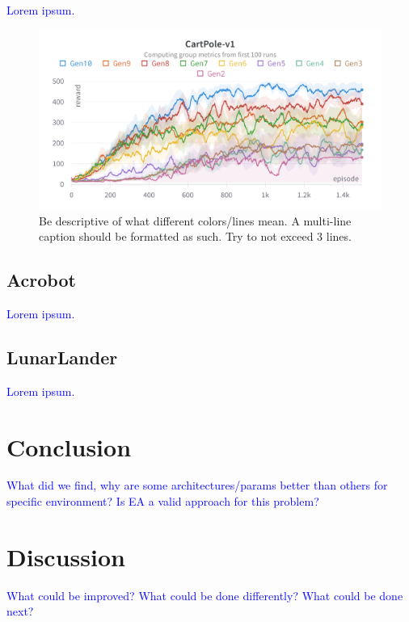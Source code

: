\documentclass{article}
\newcommand{\TODO}[1]{\textcolor{blue}{#1}}
\begin{document}
\TODO{Lorem ipsum.}

\begin{figure}[htbp]
    \centering
    \includegraphics[width=0.9\linewidth]{figs/lc-cp.png}
    \caption{
        Be descriptive of what different colors/lines mean.
        A multi-line caption should be formatted as such.
        Try to not exceed 3 lines.
    }
    \label{fig:lc-cp}
\end{figure}

\subsection{Acrobot}
\label{ssec:ab}

\TODO{Lorem ipsum.}

\subsection{LunarLander}
\label{ssec:ll}

\TODO{Lorem ipsum.}

\section{Conclusion}
\label{sec:conc}

\TODO{
    What did we find, why are some architectures/params better than others for specific environment?
    Is EA a valid approach for this problem?
}

\section{Discussion}
\label{sec:disc}

\TODO{
    What could be improved?
    What could be done differently?
    What could be done next?
}


\end{document}
